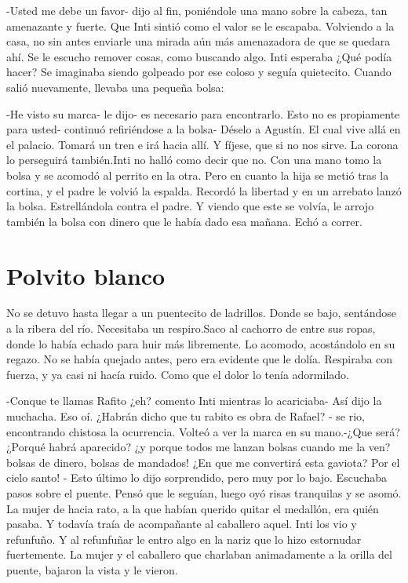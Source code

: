 -Usted me debe un favor- dijo al fin, poniéndole una mano sobre la cabeza, tan amenazante y fuerte. Que Inti sintió como el valor se le escapaba. Volviendo a la casa, no sin antes enviarle una mirada aún más amenazadora de que se quedara ahí. Se le escucho remover cosas, como buscando algo. Inti esperaba ¿Qué podía hacer? Se imaginaba siendo golpeado por ese coloso y seguía quietecito. Cuando salió nuevamente, llevaba una pequeña bolsa:

-He visto su marca- le dijo- es necesario para encontrarlo. Esto no es propiamente para usted- continuó refiriéndose a la bolsa- Déselo a Agustín. El cual vive allá en el palacio. Tomará un tren e irá hacia allí. Y fíjese, que si no nos sirve. La corona lo perseguirá también.Inti no halló como decir que no. Con una mano tomo la bolsa y se acomodó al perrito en la otra. Pero en cuanto la hija se metió tras la cortina, y el padre le volvió la espalda. Recordó la libertad y en un arrebato lanzó la bolsa. Estrellándola contra el padre. Y viendo que este se volvía, le arrojo también la bolsa con dinero que le había dado esa mañana. Echó a correr.



\chapter{Polvito blanco}
No se detuvo hasta llegar a un puentecito de ladrillos. Donde se bajo, sentándose a la ribera del río. Necesitaba un respiro.Saco al cachorro de entre sus ropas, donde lo había echado para huir más libremente. Lo acomodo, acostándolo en su regazo. No se había quejado antes, pero era evidente que le dolía. Respiraba con fuerza, y ya casi ni hacía ruido. Como que el dolor lo tenía adormilado.

-Conque te llamas Rafito ¿eh? comento Inti mientras lo acariciaba- Así dijo la muchacha. Eso oí. ¿Habrán dicho que tu rabito es obra de Rafael? - se rio, encontrando chistosa la ocurrencia. Volteó a ver la marca en su mano.-¿Que será? ¿Porqué habrá aparecido? ¿y porque todos me lanzan bolsas cuando me la ven? bolsas de dinero, bolsas de mandados! ¿En que me convertirá esta gaviota? Por el cielo santo! - Esto último lo dijo sorprendido, pero muy por lo bajo. Escuchaba pasos sobre el puente. Pensó que le seguían, luego oyó risas tranquilas y se asomó. La mujer de hacia rato, a la que habían querido quitar el medallón, era quién pasaba. Y todavía traía de acompañante al caballero aquel. Inti los vio y refunfuño. Y al refunfuñar le entro algo en la nariz que lo hizo estornudar fuertemente. La mujer y el caballero que charlaban animadamente a la orilla del puente, bajaron la vista y le vieron.

